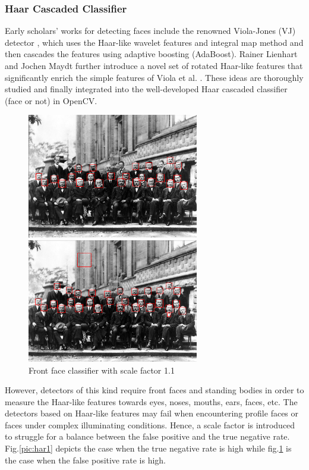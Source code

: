 \subsubsection{Haar Cascaded Classifier}
Early scholars' works for detecting faces include the renowned Viola-Jones (VJ) detector \cite{viola2001rapid}, which uses the Haar-like wavelet features and integral map method and then cascades the features using adaptive boosting (AdaBoost). Rainer Lienhart and Jochen Maydt further introduce a novel set of rotated Haar-like features that significantly enrich the simple features of Viola et al. \cite{lienhart2002extended}. These ideas are thoroughly studied and finally integrated into the well-developed Haar cascaded classifier (face or not) in OpenCV. 
\begin{figure}[H]
    \begin{minipage}[t]{0.47\textwidth}
        \centering\includegraphics[width=7.5cm]{./figures/har1.png}
        \caption{Front face classifier with scale factor 1.3}
        \label{pic:har1}
    \end{minipage}
    \qquad
    \begin{minipage}[t]{0.47\textwidth}
        \centering\includegraphics[width=7.5cm]{./figures/har2.png}
        \caption{Front face classifier with scale factor 1.1}
        \label{pic:har2}
    \end{minipage}
\end{figure}
However, detectors of this kind require front faces and standing bodies in order to measure the Haar-like features towards eyes, noses, mouths, ears, faces, etc. The detectors based on Haar-like features may fail when encountering profile faces or faces under complex illuminating conditions. Hence, a scale factor is introduced to struggle for a balance between the false positive and the true negative rate. Fig.\ref{pic:har1} depicts the case when the true negative rate is high while fig.\ref{pic:har2} is the case when the false positive rate is high.

